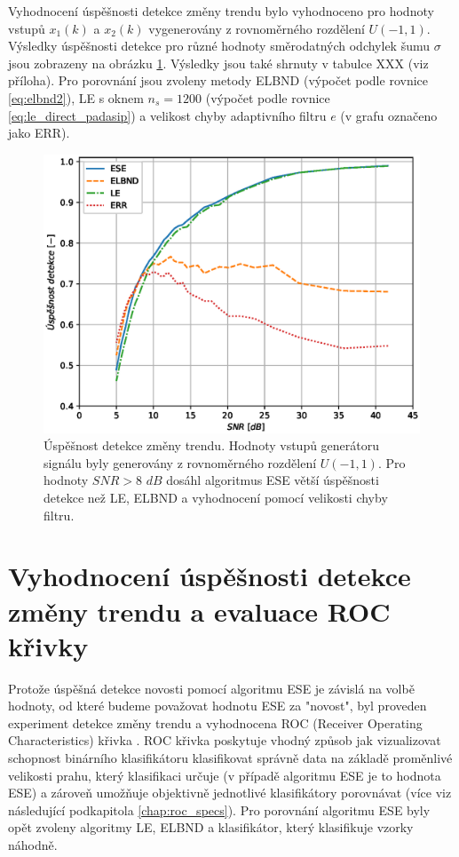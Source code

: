 Vyhodnocení úspěšnosti detekce změny trendu bylo vyhodnoceno pro hodnoty vstupů $x_1(k)$ a $x_2(k)$ vygenerovány z rovnoměrného rozdělení $U(-1,1)$. Výsledky úspěšnosti detekce pro různé hodnoty směrodatných odchylek šumu $\sigma$ jsou zobrazeny na obrázku \ref{fig:trend_stats}. Výsledky jsou také shrnuty v tabulce XXX (viz příloha). Pro porovnání jsou zvoleny metody ELBND (výpočet podle rovnice \ref{eq:elbnd2}), LE s oknem $n_s=1200$ (výpočet podle rovnice \ref{eq:le_direct_padasip}) a velikost chyby adaptivního filtru $e$ (v grafu označeno jako ERR).

\begin{figure}[!ht]
    \centering
    \includegraphics[scale=0.63]{IMG/mdpi/trendchange_stats.eps}
    \caption{Úspěšnost detekce změny trendu. Hodnoty vstupů generátoru signálu byly generovány z rovnoměrného rozdělení $U(-1,1)$. Pro hodnoty $SNR > 8$ $dB$ dosáhl algoritmus ESE větší úspěšnosti detekce než LE, ELBND a vyhodnocení pomocí velikosti chyby filtru.}
    \label{fig:trend_stats}
\end{figure}


\section{Vyhodnocení úspěšnosti detekce změny trendu a evaluace ROC křivky}
Protože úspěšná detekce novosti pomocí algoritmu ESE je závislá na volbě hodnoty, od které budeme považovat hodnotu ESE za "novost", byl proveden experiment detekce změny trendu a vyhodnocena ROC (Receiver Operating Characteristics) křivka \cite{roc_orig}. ROC křivka poskytuje vhodný způsob jak vizualizovat schopnost binárního klasifikátoru klasifikovat správně data na základě proměnlivé velikosti prahu, který klasifikaci určuje (v případě algoritmu ESE je to hodnota ESE) a zároveň umožňuje objektivně jednotlivé klasifikátory porovnávat \cite{roc_bible} (více viz následující podkapitola \ref{chap:roc_specs}). Pro porovnání algoritmu ESE byly opět zvoleny algoritmy LE, ELBND a klasifikátor, který klasifikuje vzorky náhodně.
